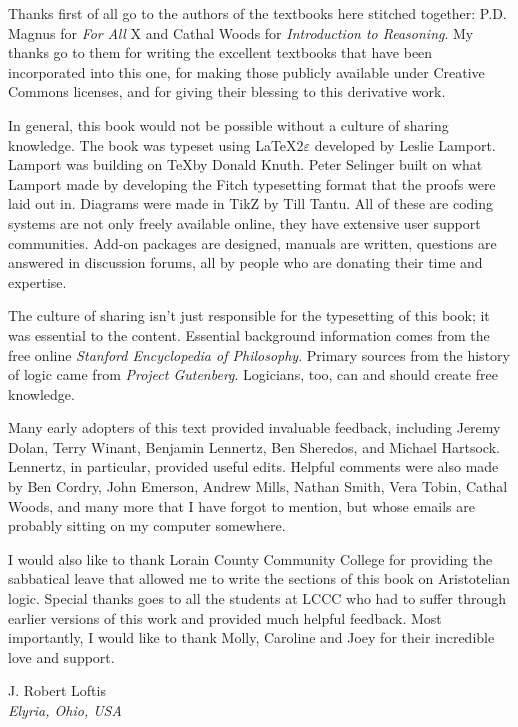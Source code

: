 \begin{fullwidth}
Thanks first of all go to the authors of the textbooks here stitched together: P.D. Magnus for \emph{For All} X and Cathal Woods for \emph{Introduction to Reasoning}. My thanks go to them for writing the excellent textbooks that have been incorporated into this one, for making those publicly available under Creative Commons licenses, and for giving their blessing to this derivative work.

In general, this book would not be possible without a culture of sharing knowledge.   The book was typeset using \LaTeX$2\varepsilon$ developed by Leslie Lamport. Lamport was building on \TeX by Donald Knuth. Peter Selinger built on what Lamport made by developing the Fitch typesetting format that the proofs were laid out in. Diagrams were made in TikZ by Till Tantu. All of these are coding systems are not only freely available online, they have extensive user support communities. Add-on packages are designed, manuals are written, questions are answered in discussion forums, all by people who are donating their time and expertise.

The culture of sharing isn't just responsible for the typesetting of this book; it was essential to the content. Essential background information comes from the free online \textit{Stanford Encyclopedia of Philosophy}. Primary sources from the history of logic came from \textit{Project Gutenberg}. Logicians, too, can and should create free knowledge.

Many early adopters of this text provided invaluable feedback, including Jeremy Dolan, Terry Winant, Benjamin Lennertz, Ben Sheredos, and Michael Hartsock. Lennertz, in particular, provided useful edits. Helpful comments were also made by Ben Cordry, John Emerson, Andrew Mills, Nathan Smith, Vera Tobin, Cathal Woods, and many more that I have forgot to mention, but whose emails are probably sitting on my computer somewhere.

I would also like to thank Lorain County Community College for providing the sabbatical leave that allowed me to write the sections of this book on Aristotelian logic. Special thanks goes to all the students at LCCC who had to suffer through earlier versions of this work and provided much helpful feedback. Most importantly, I would like to thank Molly, Caroline and Joey for their incredible love and support.

 \begin{adjustwidth}{2em}{0em}
 J. Robert Loftis \\
\noindent \emph{Elyria, Ohio, USA}
\end{adjustwidth}
\end{fullwidth}
\pagebreak


